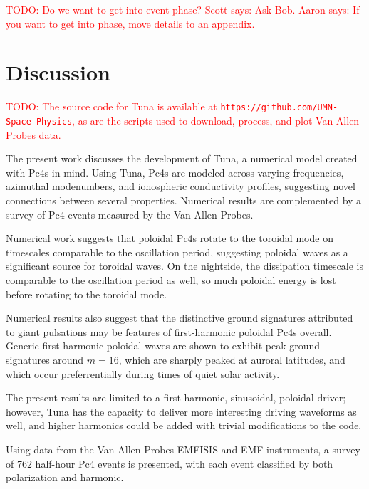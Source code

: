 \documentclass{article}
\newcommand{\todo}[1]{ \textcolor{red}{TODO: #1} }
\newcommand{\azm}{\ensuremath{m}\xspace}
\begin{document}
\todo{Do we want to get into event phase? Scott says: Ask Bob. Aaron says: If you want to get into phase, move details to an appendix.}


\section{Discussion}

\todo{The source code for Tuna is available at \texttt{https://github.com/UMN-Space-Physics}, as are the scripts used to download, process, and plot Van Allen Probes data.}

The present work discusses the development of Tuna, a numerical model created with Pc4s in mind. Using Tuna, Pc4s are modeled across varying frequencies, azimuthal modenumbers, and ionospheric conductivity profiles, suggesting novel connections between several properties. Numerical results are complemented by a survey of Pc4 events measured by the Van Allen Probes.

Numerical work suggests that poloidal Pc4s rotate to the toroidal mode on timescales comparable to the oscillation period, suggesting poloidal waves as a significant source for toroidal waves. On the nightside, the dissipation timescale is comparable to the oscillation period as well, so much poloidal energy is lost before rotating to the toroidal mode.

Numerical results also suggest that the distinctive ground signatures attributed to giant pulsations may be features of first-harmonic poloidal Pc4s overall. Generic first harmonic poloidal waves are shown to exhibit peak ground signatures around ${\azm = 16}$, which are sharply peaked at auroral latitudes, and which occur preferrentially during times of quiet solar activity.

The present results are limited to a first-harmonic, sinusoidal, poloidal driver; however, Tuna has the capacity to deliver more interesting driving waveforms as well, and higher harmonics could be added with trivial modifications to the code.


Using data from the Van Allen Probes EMFISIS and EMF instruments, a survey of 762 half-hour Pc4 events is presented, with each event classified by both polarization and harmonic.
\end{document}
